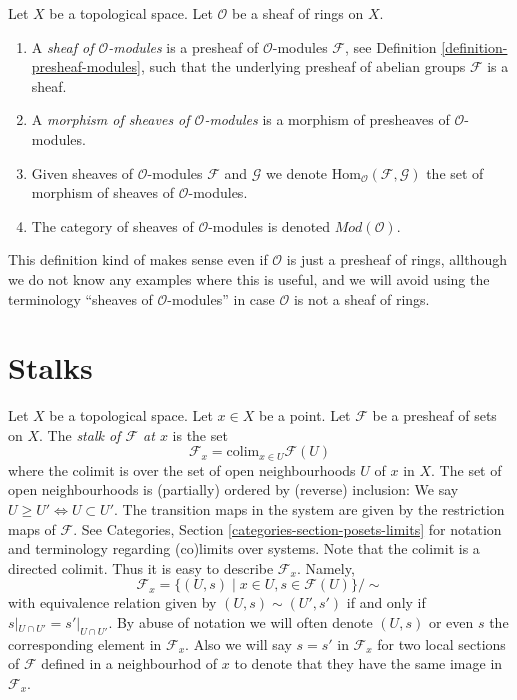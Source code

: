 \begin{definition}
\label{definition-sheaf-modules}
Let $X$ be a topological space.
Let $\mathcal{O}$ be a sheaf of rings on $X$.
\begin{enumerate}
\item A {\it sheaf of $\mathcal{O}$-modules} is a presheaf
of $\mathcal{O}$-modules $\mathcal{F}$,
see Definition \ref{definition-presheaf-modules},
such that the underlying presheaf of abelian groups $\mathcal{F}$
is a sheaf.
\item A {\it morphism of sheaves of $\mathcal{O}$-modules}
is a morphism of presheaves of $\mathcal{O}$-modules.
\item Given sheaves of $\mathcal{O}$-modules
$\mathcal{F}$ and $\mathcal{G}$ we denote 
$\text{Hom}_{\mathcal{O}}(\mathcal{F}, \mathcal{G})$
the set of morphism of sheaves of $\mathcal{O}$-modules.
\item The category of sheaves of $\mathcal{O}$-modules
is denoted $\textit{Mod}(\mathcal{O})$.
\end{enumerate}
\end{definition}

\noindent
This definition kind of makes sense even if $\mathcal{O}$ is just a
presheaf of rings, allthough we do not know any examples where
this is useful, and we will avoid using the terminology
``sheaves of $\mathcal{O}$-modules''
in case $\mathcal{O}$ is not a sheaf of rings.







\section{Stalks}
\label{section-stalks}

\noindent
Let $X$ be a topological space. Let $x \in X$ be a point.
Let $\mathcal{F}$ be a presheaf of sets on $X$.
The {\it stalk of $\mathcal{F}$ at $x$} is the set
$$
\mathcal{F}_x
=
\text{colim}_{x\in U} \mathcal{F}(U)
$$
where the colimit is over the set of open neighbourhoods
$U$ of $x$ in $X$. The set of open neighbourhoods is (partially)
ordered by (reverse) inclusion:
We say $U \geq U' \Leftrightarrow U \subset U'$.
The transition maps in the system are
given by the restriction maps of $\mathcal{F}$.
See Categories, Section \ref{categories-section-posets-limits}
for notation and terminology regarding (co)limits over systems.
Note that the colimit is a directed colimit.
Thus it is easy to describe $\mathcal{F}_x$. Namely,
$$
\mathcal{F}_x
=
\{
(U,s)
\mid
x\in U, s\in \mathcal{F}(U)
\}/\sim
$$
with equivalence relation given by $(U,s) \sim (U', s')$
if and only if $s|_{U\cap U'} = s'|_{U\cap U'}$. By abuse of
notation we will often denote $(U, s)$
or even $s$ the corresponding element in $\mathcal{F}_x$.
Also we will say $s = s'$ in $\mathcal{F}_x$ for two local sections
of $\mathcal{F}$ defined in a neighbourhod of $x$ to denote that
they have the same image in $\mathcal{F}_x$.

